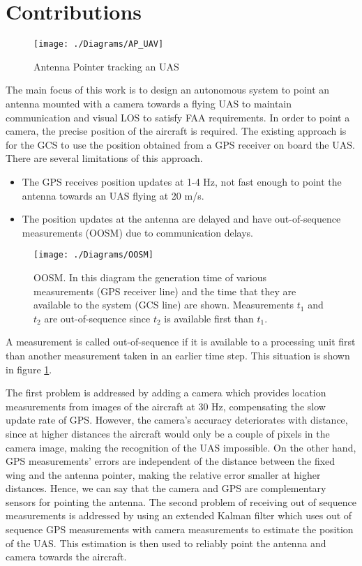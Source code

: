 \section{Contributions}
\begin{figure}[h!]
  \centering
  \texttt{[image: ./Diagrams/AP\_UAV]}
  \caption{Antenna Pointer tracking an UAS}
\end{figure}
The main focus of this work is to design an autonomous system to point an antenna mounted with a camera towards a flying UAS to maintain communication and visual LOS to satisfy FAA requirements. In order to point a camera, the precise position of the aircraft is required. The existing approach is for the GCS to use the position obtained from a GPS receiver on board the UAS. There are several limitations of this approach. 
\begin{itemize}[nosep]
\item The GPS receives position updates at 1-4 Hz, not fast enough to point the antenna towards an UAS flying at 20 m/s.
\item The position updates at the antenna are delayed and have out-of-sequence measurements (OOSM) due to communication delays.
\end{itemize}
\begin{figure}[h!]
  \centering
  \texttt{[image: ./Diagrams/OOSM]}
  \caption[Out-Of-Sequence Measurement]{OOSM. 
  In this diagram the generation time of various measurements (GPS receiver line) and the time that they are available to the system (GCS line) are shown. Measurements $t_1$ and $t_2$ are out-of-sequence since $t_2$ is available first than $t_1$.\label{fig:OOSM}}
\end{figure}
A measurement is called out-of-sequence if it is available to a processing unit first than another measurement taken in an earlier time step. This situation is shown in figure \ref{fig:OOSM}.

The first problem is addressed by adding a camera which provides location measurements from images of the aircraft at 30 Hz, compensating the slow update rate of GPS. However, the camera's accuracy deteriorates with distance, since at higher distances the aircraft would only be a couple of pixels in the camera image, making the recognition of the UAS impossible. On the other hand, GPS measurements' errors are independent of the distance between the fixed wing and the antenna pointer, making the relative error smaller at higher distances. Hence, we can say that the camera and GPS are complementary sensors for pointing the antenna. The second problem of receiving out of sequence measurements is addressed by using an extended Kalman filter which uses out of sequence GPS measurements with camera measurements to estimate the position of the UAS. This estimation is then used to reliably point the antenna and camera towards the aircraft.

